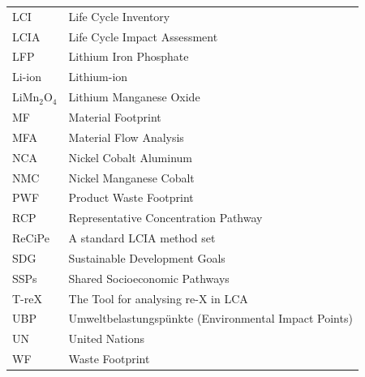 \documentclass[a4paper,fleqn,longmktitle]{cas-dc}
\begin{document}
\begin{table}[H]
\begin{tabular}{ll}
      LCI               & Life Cycle Inventory                                                \\
      LCIA              & Life Cycle Impact Assessment                                        \\
      LFP               & Lithium Iron Phosphate                                              \\
      Li-ion            & Lithium-ion                                                         \\
      LiMn\(_2\)O\(_4\) & Lithium Manganese Oxide                                             \\
      MF                & Material Footprint                                                  \\
      MFA               & Material Flow Analysis                                              \\
      NCA               & Nickel Cobalt Aluminum                                              \\
      NMC               & Nickel Manganese Cobalt                                             \\
      PWF               & Product Waste Footprint                                             \\
      RCP               & Representative Concentration Pathway                                \\
      ReCiPe            & A standard LCIA method set                                          \\
      SDG               & Sustainable Development Goals                                       \\
      SSPs              & Shared Socioeconomic Pathways                                       \\
      T-reX             & The Tool for analysing re-X in LCA                                  \\
      UBP               & Umweltbelastungspünkte (Environmental Impact Points)                \\
      UN                & United Nations                                                      \\
      WF                & Waste Footprint                                                     \\
      \bottomrule
  \end{tabular}
\end{table}
\end{document}
